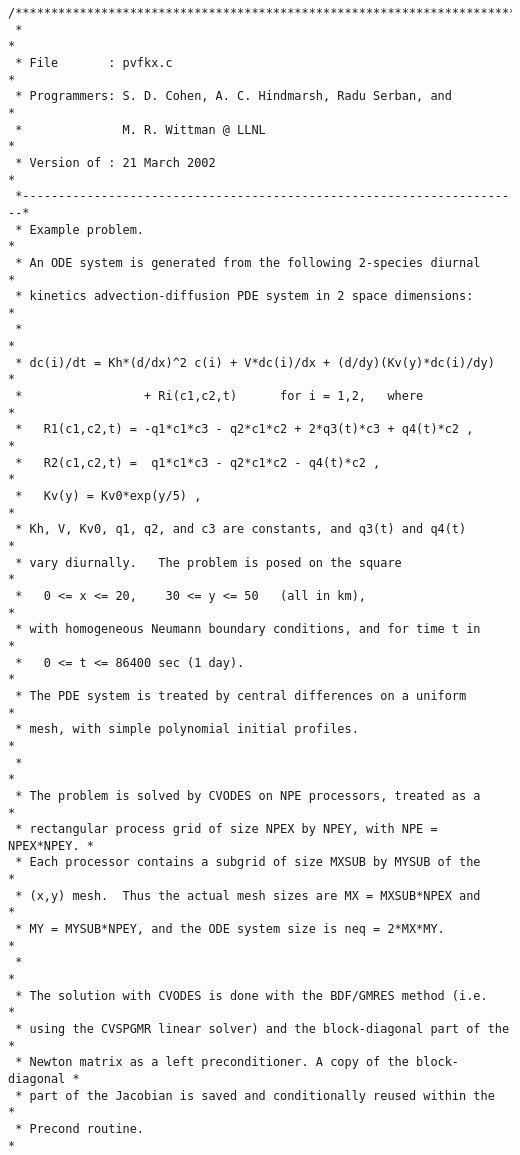 \begin{verbatim}
/************************************************************************
 *                                                                      *
 * File       : pvfkx.c                                                 *
 * Programmers: S. D. Cohen, A. C. Hindmarsh, Radu Serban, and          *
 *              M. R. Wittman @ LLNL                                    *
 * Version of : 21 March 2002                                           *
 *----------------------------------------------------------------------*
 * Example problem.                                                     *
 * An ODE system is generated from the following 2-species diurnal      *
 * kinetics advection-diffusion PDE system in 2 space dimensions:       *
 *                                                                      *
 * dc(i)/dt = Kh*(d/dx)^2 c(i) + V*dc(i)/dx + (d/dy)(Kv(y)*dc(i)/dy)    *
 *                 + Ri(c1,c2,t)      for i = 1,2,   where              *
 *   R1(c1,c2,t) = -q1*c1*c3 - q2*c1*c2 + 2*q3(t)*c3 + q4(t)*c2 ,       *
 *   R2(c1,c2,t) =  q1*c1*c3 - q2*c1*c2 - q4(t)*c2 ,                    *
 *   Kv(y) = Kv0*exp(y/5) ,                                             *
 * Kh, V, Kv0, q1, q2, and c3 are constants, and q3(t) and q4(t)        *
 * vary diurnally.   The problem is posed on the square                 *
 *   0 <= x <= 20,    30 <= y <= 50   (all in km),                      *
 * with homogeneous Neumann boundary conditions, and for time t in      *
 *   0 <= t <= 86400 sec (1 day).                                       *
 * The PDE system is treated by central differences on a uniform        *
 * mesh, with simple polynomial initial profiles.                       *
 *                                                                      *
 * The problem is solved by CVODES on NPE processors, treated as a      *
 * rectangular process grid of size NPEX by NPEY, with NPE = NPEX*NPEY. *
 * Each processor contains a subgrid of size MXSUB by MYSUB of the      *
 * (x,y) mesh.  Thus the actual mesh sizes are MX = MXSUB*NPEX and      *
 * MY = MYSUB*NPEY, and the ODE system size is neq = 2*MX*MY.           *
 *                                                                      *
 * The solution with CVODES is done with the BDF/GMRES method (i.e.     *
 * using the CVSPGMR linear solver) and the block-diagonal part of the  *
 * Newton matrix as a left preconditioner. A copy of the block-diagonal *
 * part of the Jacobian is saved and conditionally reused within the    *
 * Precond routine.                                                     *

\end{verbatim}
